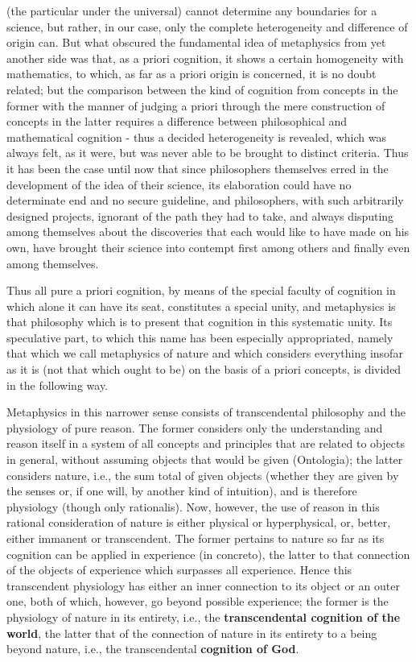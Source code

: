 \documentclass{article}
\begin{document}
(the particular under the universal)
cannot determine any boundaries for a science,
but rather, in our case, only the
complete heterogeneity and difference of origin can. 
But what obscured the fundamental idea of metaphysics
from yet another side was that, as a priori cognition,
it shows a certain homogeneity with mathematics, to which,
as far as a priori origin is concerned, it is no doubt related;
but the comparison between the kind of
cognition from concepts in the former
with the manner of judging a priori 
through the mere construction of concepts in the latter
requires a difference between philosophical and mathematical cognition -
thus a decided heterogeneity is revealed, which was always felt, as it were,
but was never able to be brought to distinct criteria.
Thus it has been the case until now that since philosophers themselves
erred  in the development of the idea of their science,
its elaboration could have no determinate end and no secure guideline,
and philosophers, with such arbitrarily designed projects,
ignorant of the path they had to take,
and always disputing among themselves about the discoveries
that each would like to have made on his own,
have brought their science into contempt
first among others and finally even among themselves.

Thus all pure a priori cognition,
by means of the special faculty of cognition
in which alone it can have its seat,
constitutes a special unity,
and metaphysics is that philosophy which is
to present that cognition in this systematic unity.
Its speculative part, to which this name has been especially appropriated,
namely that which we call metaphysics of nature
and which considers everything insofar as it is
(not that which ought to be) 
on the basis of a priori concepts, 
is divided in the following way.

Metaphysics in this narrower sense consists of 
transcendental philosophy and the physiology of pure reason.
The former considers only the understanding and reason itself 
in a system of all concepts and principles 
that are related to objects in general,
without assuming objects that would be given (Ontologia);
the latter considers nature, i.e.,
the sum total of given objects
(whether they are given by the senses or,
if one will, by another kind of intuition),
and is therefore physiology
(though only rationalis).
Now, however, the use of reason in this rational consideration of nature
is either physical or hyperphysical,
or, better, either immanent or transcendent.
The former pertains to nature so far as 
its cognition can be applied in experience (in concreto),
the latter to that connection of the objects of experience
which surpasses all experience.
Hence this transcendent physiology has either an inner
connection to its object or an outer one,
both of which, however, go beyond possible experience;
the former is the physiology of nature in its entirety, i.e.,
the \textbf{transcendental cognition of the world},
the latter that of the connection of nature in its entirety to a being beyond nature, i.e.,
the transcendental \textbf{cognition of God}.
\end{document}
